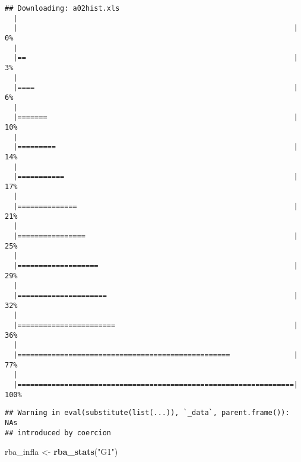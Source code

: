 \documentclass[]{article}
\newenvironment{Shaded}{\begin{snugshade}}{\end{snugshade}}
\newcommand{\KeywordTok}[1]{\textcolor[rgb]{0.13,0.29,0.53}{\textbf{#1}}}
\newcommand{\StringTok}[1]{\textcolor[rgb]{0.31,0.60,0.02}{#1}}
\newcommand{\NormalTok}[1]{#1}
\begin{document}
\begin{verbatim}
## Downloading: a02hist.xls
  |                                                                       
  |                                                                 |   0%
  |                                                                       
  |==                                                               |   3%
  |                                                                       
  |====                                                             |   6%
  |                                                                       
  |=======                                                          |  10%
  |                                                                       
  |=========                                                        |  14%
  |                                                                       
  |===========                                                      |  17%
  |                                                                       
  |==============                                                   |  21%
  |                                                                       
  |================                                                 |  25%
  |                                                                       
  |===================                                              |  29%
  |                                                                       
  |=====================                                            |  32%
  |                                                                       
  |=======================                                          |  36%
  |                                                                       
  |==================================================               |  77%
  |                                                                       
  |=================================================================| 100%
\end{verbatim}

\begin{verbatim}
## Warning in eval(substitute(list(...)), `_data`, parent.frame()): NAs
## introduced by coercion
\end{verbatim}

\begin{Shaded}
\begin{Highlighting}[]
\NormalTok{  rba_infla <-}\StringTok{ }\KeywordTok{rba_stats}\NormalTok{(}\StringTok{"G1"}\NormalTok{)}
\end{Highlighting}
\end{Shaded}
\end{document}
